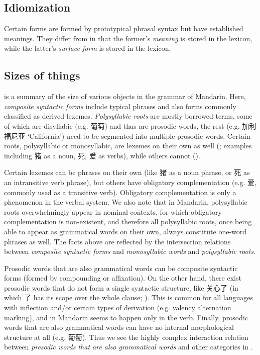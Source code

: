 \documentclass[UTF8, a4paper, oneside, scheme=plain, 12pt]{ctexrep}
\newcommand*{\term}[1]{\emph{#1}}
\newcommand{\form}[1]{\emph{#1}}
\newcommand{\translate}[1]{`#1'}
\begin{document}
\subsection{Idiomization}\label{sec:grammatical.lexicon.idiom}

Certain forms are formed by prototypical phrasal syntax
but have established meanings.
They differ from  in that 
the former's \emph{meaning} is stored in the lexicon,
while the latter's \form{surface form} is stored in the lexicon.

\subsection{Sizes of things}\label{sec:grammatical.lexicon.size-of-things}

 is a summary of the size of various objects in the grammar of Mandarin.
Here, \term{composite syntactic forms} include typical phrases and
also forms commonly classified as derived lexemes.
\term{Polysyllabic roots} are mostly borrowed terms,
some of which are disyllabic (e.g. 葡萄) and thus are prosodic words,
the rest (e.g. 加利福尼亚 \translate{California}) need to be segmented into multiple prosodic words.
Certain roots, polysyllabic or monosyllabic, are lexemes on their own as well
(;
examples including 猪 as a noun, 死, 爱 as verbs),
while others cannot ().

Certain lexemes can be phrases on their own
(like 猪 as a noun phrase, or 死 as an intransitive verb phrase),
but others have obligatory complementation (e.g. 爱, commonly used as a transitive verb).
Obligatory complementation is only a phenomenon in the verbal system.
We also note that in Mandarin, polysyllabic roots overwhelmingly appear in nominal contexts,
for which obligatory complementation is non-existent,
and therefore all polysyllabic roots,
once being able to appear as grammatical words on their own,
always constitute one-word phrases as well.
The facts above are reflected by the intersection relations between \term{composite syntactic forms}
and \term{monosyllabic words} and \term{polysyllabic roots}.

Prosodic words that are also grammatical words can be composite syntactic forms
(formed by compounding or affixation).
On the other hand, there exist prosodic words that do not form a single syntactic structure,
like 关心了 (in which 了 has its scope over the whole clause; ).
This is common for all languages with inflection and/or certain types of derivation (e.g. valency alternation marking),
and in Mandarin seems to happen only in the verb.
Finally, prosodic words that are also grammatical words 
can have no internal morphological structure at all (e.g. 葡萄).
Thus we see the highly complex interaction relation between \term{presodic words that are also grammatical words}
and other categories in .
\end{document}
